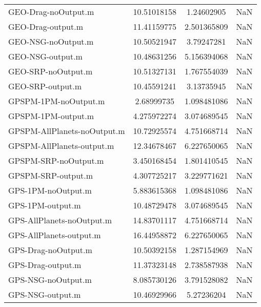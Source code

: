 \begin{table}[htbp!]
\begin{tabular}{lccc}
         GEO-Drag-noOutput.m & 10.51018158 & 1.24602905 & NaN \\
         GEO-Drag-output.m & 11.41159775 & 2.501365809 & NaN \\
         GEO-NSG-noOutput.m & 10.50521947 & 3.79247281 & NaN \\
         GEO-NSG-output.m & 10.48631256 & 5.156394068 & NaN \\
         GEO-SRP-noOutput.m & 10.51327131 & 1.767554039 & NaN \\
         GEO-SRP-output.m & 10.45591241 & 3.13735945 & NaN \\
         GPSPM-1PM-noOutput.m & 2.68999735 & 1.098481086 & NaN \\
         GPSPM-1PM-output.m & 4.275972274 & 3.074689545 & NaN \\
         GPSPM-AllPlanets-noOutput.m & 10.72925574 & 4.751668714 & NaN \\
         GPSPM-AllPlanets-output.m & 12.34678467 & 6.227650065 & NaN \\
         GPSPM-SRP-noOutput.m & 3.450168454 & 1.801410545 & NaN \\
         GPSPM-SRP-output.m & 4.307725217 & 3.229771621 & NaN \\
         GPS-1PM-noOutput.m & 5.883615368 & 1.098481086 & NaN \\
         GPS-1PM-output.m & 10.48729478 & 3.074689545 & NaN \\
         GPS-AllPlanets-noOutput.m & 14.83701117 & 4.751668714 & NaN \\
         GPS-AllPlanets-output.m & 16.44958872 & 6.227650065 & NaN \\
         GPS-Drag-noOutput.m & 10.50392158 & 1.287154969 & NaN \\
         GPS-Drag-output.m & 11.37323148 & 2.738587938 & NaN \\
         GPS-NSG-noOutput.m & 8.085730126 & 3.791528082 & NaN \\
         GPS-NSG-output.m & 10.46929966 & 5.27236204 & NaN \\

\end{tabular}
\end{table}
